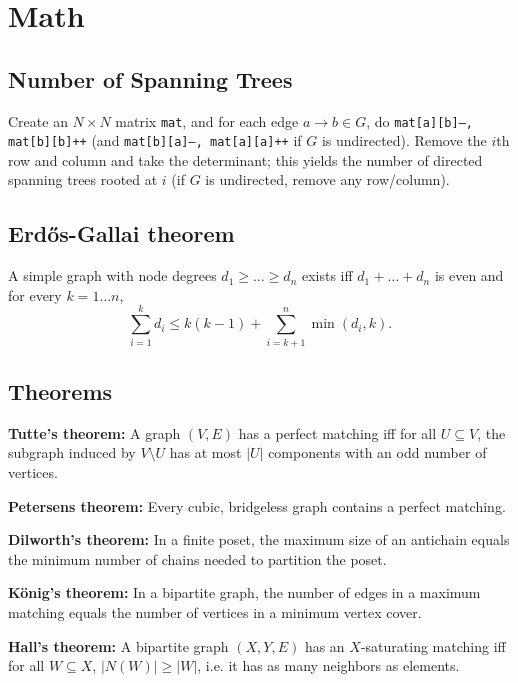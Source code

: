 \section{Math}
	\subsection{Number of Spanning Trees}
		Create an $N\times N$ matrix \texttt{mat}, and for each edge $a \rightarrow b \in G$, do
		\texttt{mat[a][b]--, mat[b][b]++} (and \texttt{mat[b][a]--, mat[a][a]++} if $G$ is undirected).
		Remove the $i$th row and column and take the determinant; this yields the number of directed spanning trees rooted at $i$
		(if $G$ is undirected, remove any row/column).

	\subsection{Erdős-Gallai theorem}
		A simple graph with node degrees $d_1 \ge \dots \ge d_n$ exists iff $d_1 + \dots + d_n$ is even and for every $k = 1\dots n$,
		\[ \sum _{i=1}^{k}d_{i}\leq k(k-1)+\sum _{i=k+1}^{n}\min(d_{i},k). \]

	\subsection{Theorems}
	\textbf{Tutte's theorem:} A graph $(V, E)$ has a perfect matching iff for all $U \subseteq V$, the subgraph induced by $V \setminus U$ has at most $|U|$ components with an odd number of vertices.

	\textbf{Petersens theorem:} Every cubic, bridgeless graph contains a perfect matching.

	\textbf{Dilworth's theorem:} In a finite poset, the maximum size of an antichain equals the minimum number of chains needed to partition the poset.

	\textbf{König's theorem:} In a bipartite graph, the number of edges in a maximum matching equals the number of vertices in a minimum vertex cover.

	\textbf{Hall's theorem:} A bipartite graph $(X, Y, E)$ has an $X$-saturating matching iff for all $W \subseteq X$, $|N(W)| \ge |W|$, i.e. it has as many neighbors as elements.
